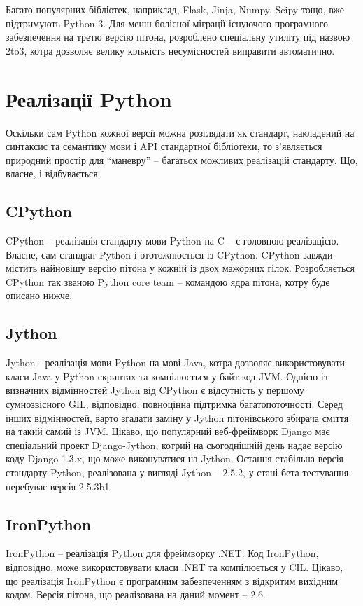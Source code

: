 \documentclass[a4paper, 12pt, onsedie]{article}
\begin{document}
Багато популярних бібліотек, наприклад, Flask, Jinja, Numpy, Scipy тощо, вже підтримують
Python 3. Для менш болісної міграції існуючого програмного забезпечення на третю версію
пітона, розроблено спеціальну утиліту під назвою 2to3, котра дозволяє велику кількість
несумісностей виправити автоматично.

\section{Реалізації Python}
Оскільки сам Python кожної версії можна розглядати як стандарт, накладений на синтаксис та
семантику мови і API стандартної бібліотеки, то з'являється природний простір для ``маневру''
 -- багатьох можливих реалізацій стандарту. Що, власне, і відбувається.

\subsection{CPython}
CPython -- реалізація стандарту мови Python на C -- є головною реалізацією. Власне, сам
стандрат Python і ототожнюється із CPython. CPython завжди містить найновішу версію пітона 
у кожній із двох мажорних гілок. Розробляється CPython так званою Python core team -- 
командою ядра пітона, котру буде описано нижче.


\subsection{Jython}
Jython - реалізація мови Python на мові Java, котра дозволяє використовувати класи Java у 
Python-скриптах та компілюється у байт-код JVM. Однією із визначних відмінностей Jython від
CPython є відсутність у першому сумнозвісного GIL, відповідно, повноцінна підтримка 
багатопоточності. Серед інших відмінностей, варто згадати заміну у Jython пітонівського 
збирача сміття на такий самий із JVM.
Цікаво, що популярний веб-фреймворк Django має спеціальний проект Django-Jython, котрий на
сьогоднішній день надає версію коду Django 1.3.x, що може виконуватися на Jython.
Остання стабільна версія стандарту Python, реалізована у вигляді Jython -- 2.5.2, у стані 
бета-тестування перебуває версія 2.5.3b1.

\subsection{IronPython}
IronPython -- реалізація Python для фреймворку .NET. Код IronPython, відповідно, може 
використовувати класи .NET та компілюється у CIL. Цікаво, що реалізація IronPython є 
програмним забезпеченням з відкритим вихідним кодом. Версія пітона, що реалізована на даний 
момент -- 2.6.
\end{document}
